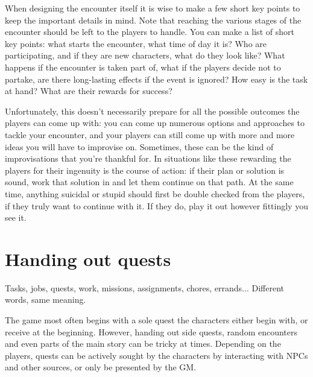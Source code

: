 \documentclass[11pt,a4paper,twocolumn]{book}
\begin{document}
    
    When designing the encounter itself it is wise to make a few short key points to keep the important details in mind. Note that reaching the various stages of the encounter should be left to the players to handle. You can make a list of short key points: what starts the encounter, what time of day it is? Who are participating, and if they are new characters, what do they look like? What happens if the encounter is taken part of, what if the players decide not to partake, are there long-lasting effects if the event is ignored? How easy is the task at hand? What are their rewards for success? 
    
    Unfortunately, this doesn't necessarily prepare for all the possible outcomes the players can come up with:
    you can come up numerous options and approaches to tackle your encounter, and your players can still come up with more and more ideas you will have to improvise on. Sometimes, these can be the kind of improvisations that you're thankful for. In situations like these rewarding the players for their ingenuity is the course of action: if their plan or solution is sound, work that solution in and let them continue on that path. At the same time, anything suicidal or stupid should first be double checked from the players, if they truly want to continue with it. If they do, play it out however fittingly you see it. 
    

    \section*{Handing out quests}
    Tasks, jobs, quests, work, missions, assignments, chores, errands... Different words, same meaning.
     
    The game most often begins with a sole quest the characters either begin with, or receive at the beginning. However, handing out side quests, random encounters and even parts of the main story can be tricky at times. Depending on the players, quests can be actively sought by the characters by interacting with NPCs and other sources, or only be presented by the GM.
    
\end{document}
